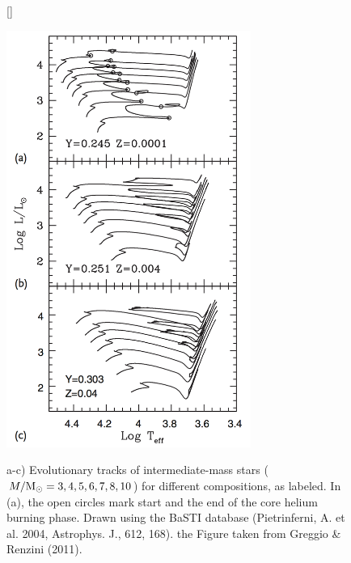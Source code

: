 \documentclass[a4paper,10pt]{article}
\begin{document}
\begin{figure}[h]
    [\FBwidth]
    {\caption{\footnotesize{a-c) Evolutionary tracks of intermediate-mass stars ($M/{\rm M_\odot}=3,4,5,6,7,8,10$) for different compositions, as labeled. In (a), the open circles mark start and the end of the core helium burning phase. Drawn using the BaSTI database (Pietrinferni, A. et al. 2004, Astrophys. J., 612, 168). the Figure taken from Greggio \& Renzini (2011).}}
    \label{fig:hrdz_int}}
    {\includegraphics[width=8cm]{figures/HRD_Z_int.png}}
\end{figure}
\end{document}
